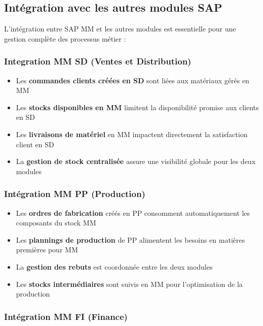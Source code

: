 \documentclass[12pt,a4paper,oneside]{report}
\begin{document}
\subsection{Intégration avec les autres modules SAP}\label{ch2:mm-integration}

L'intégration entre SAP MM et les autres modules est essentielle pour une gestion complète des processus métier :

\subsubsection{Integration MM SD (Ventes et Distribution)}\label{ch2:mm-int-sd}

\begin{itemize}[label=---, itemsep=0.15em]
	\item Les \textbf{commandes clients créées en SD} sont liées aux matériaux gérés en MM
	\item Les \textbf{stocks disponibles en MM} limitent la disponibilité promise aux clients en SD
	\item Les \textbf{livraisons de matériel} en MM impactent directement la satisfaction client en SD
	\item La \textbf{gestion de stock centralisée} assure une visibilité globale pour les deux modules
\end{itemize}

\subsubsection{Intégration MM PP (Production)}\label{ch2:mm-int-pp}

\begin{itemize}[label=---, itemsep=0.15em]
	\item Les \textbf{ordres de fabrication} créés en PP consomment automatiquement les composants du stock MM
	\item Les \textbf{plannings de production} de PP alimentent les besoins en matières premières pour MM
	\item La \textbf{gestion des rebuts} est coordonnée entre les deux modules
	\item Les \textbf{stocks intermédiaires} sont suivis en MM pour l'optimisation de la production
\end{itemize}

\subsubsection{Intégration MM FI (Finance)}\label{ch2:mm-int-fi}
\end{document}
